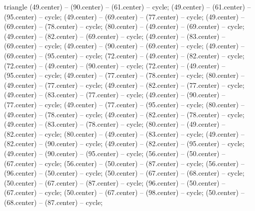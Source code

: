 \begin{pgfonlayer}{triangle}
 (49.center) -- (90.center) -- (61.center) -- cycle; 
 (49.center) -- (61.center) -- (95.center) -- cycle; 
 (49.center) -- (69.center) -- (77.center) -- cycle; 
 (49.center) -- (69.center) -- (78.center) -- cycle; 
 (80.center) -- (49.center) -- (69.center) -- cycle; 
 (49.center) -- (82.center) -- (69.center) -- cycle; 
 (49.center) -- (83.center) -- (69.center) -- cycle; 
 (49.center) -- (90.center) -- (69.center) -- cycle; 
 (49.center) -- (69.center) -- (95.center) -- cycle; 
 (72.center) -- (49.center) -- (82.center) -- cycle; 
 (72.center) -- (49.center) -- (90.center) -- cycle; 
 (72.center) -- (49.center) -- (95.center) -- cycle; 
 (49.center) -- (77.center) -- (78.center) -- cycle; 
 (80.center) -- (49.center) -- (77.center) -- cycle; 
 (49.center) -- (82.center) -- (77.center) -- cycle; 
 (49.center) -- (83.center) -- (77.center) -- cycle; 
 (49.center) -- (90.center) -- (77.center) -- cycle; 
 (49.center) -- (77.center) -- (95.center) -- cycle; 
 (80.center) -- (49.center) -- (78.center) -- cycle; 
 (49.center) -- (82.center) -- (78.center) -- cycle; 
 (49.center) -- (83.center) -- (78.center) -- cycle; 
 (80.center) -- (49.center) -- (82.center) -- cycle; 
 (80.center) -- (49.center) -- (83.center) -- cycle; 
 (49.center) -- (82.center) -- (90.center) -- cycle; 
 (49.center) -- (82.center) -- (95.center) -- cycle; 
 (49.center) -- (90.center) -- (95.center) -- cycle; 
 (56.center) -- (50.center) -- (67.center) -- cycle; 
 (56.center) -- (50.center) -- (87.center) -- cycle; 
 (56.center) -- (96.center) -- (50.center) -- cycle; 
 (50.center) -- (67.center) -- (68.center) -- cycle; 
 (50.center) -- (67.center) -- (87.center) -- cycle; 
 (96.center) -- (50.center) -- (67.center) -- cycle; 
 (50.center) -- (67.center) -- (98.center) -- cycle; 
 (50.center) -- (68.center) -- (87.center) -- cycle; 

\end{pgfonlayer}
